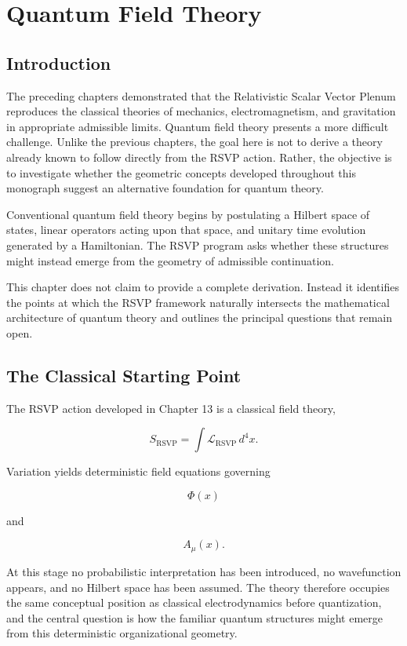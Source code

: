 \documentclass[11pt,oneside]{book}
\numberwithin{equation}{chapter}
\theoremstyle{definition}
\theoremstyle{plain}
\begin{document}
\chapter{Quantum Field Theory}

\section{Introduction}

The preceding chapters demonstrated that the Relativistic Scalar Vector
Plenum reproduces the classical theories of mechanics, electromagnetism, and
gravitation in appropriate admissible limits. Quantum field theory presents
a more difficult challenge. Unlike the previous chapters, the goal here is
not to derive a theory already known to follow directly from the RSVP
action. Rather, the objective is to investigate whether the geometric
concepts developed throughout this monograph suggest an alternative
foundation for quantum theory.

Conventional quantum field theory begins by postulating a Hilbert space of
states, linear operators acting upon that space, and unitary time evolution
generated by a Hamiltonian. The RSVP program asks whether these structures
might instead emerge from the geometry of admissible continuation.

This chapter does not claim to provide a complete derivation. Instead it
identifies the points at which the RSVP framework naturally intersects the
mathematical architecture of quantum theory and outlines the principal
questions that remain open.

\section{The Classical Starting Point}

The RSVP action developed in Chapter 13 is a classical field theory,

\[
S_{\mathrm{RSVP}}
=
\int
\mathcal L_{\mathrm{RSVP}}
\,d^4x.
\]

Variation yields deterministic field equations governing

\[
\Phi(x)
\]

and

\[
A_\mu(x).
\]

At this stage no probabilistic interpretation has been introduced, no wavefunction appears, and no Hilbert space has been assumed. The theory therefore occupies the same conceptual position as classical electrodynamics before quantization, and the central question is how the familiar quantum structures might emerge from this deterministic organizational geometry.
\end{document}
